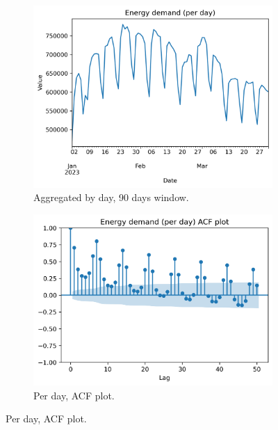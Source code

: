 \begin{figure}[H]\ContinuedFloat
    \begin{subfigure}{.44\textwidth}
        \centering
        \includegraphics[width=1\linewidth]{images/variable_analysis/esios_demand_d_90}
        \caption{Aggregated by day, 90 days window.}
    \end{subfigure}
    \begin{subfigure}{.45\textwidth}
        \centering
        \includegraphics[width=1\linewidth]{images/variable_analysis/esios_demand_d_acf}
        \caption{Per day, ACF plot.}
    \end{subfigure}
\end{figure}

